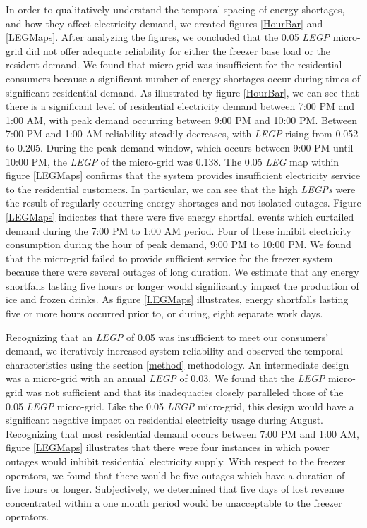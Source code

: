 \documentclass[11p]{article}
\begin{document}
 
In order to qualitatively understand the temporal spacing of energy shortages, and how they affect electricity demand, we created figures \ref{HourBar} and \ref{LEGMaps}.
After analyzing the figures, we concluded that the 0.05 \emph{LEGP} micro-grid did not offer adequate reliability for either the freezer base load or the resident demand.
We found that micro-grid was insufficient for the residential consumers because a significant number of energy shortages occur during times of significant residential demand.
As illustrated by figure \ref{HourBar}, we can see that there is a significant level of residential electricity demand between 7:00 PM and 1:00 AM, with peak demand occurring between 9:00 PM and 10:00 PM.
Between 7:00 PM and 1:00 AM reliability steadily decreases, with \emph{LEGP} rising from 0.052 to 0.205. 
During the peak demand window, which occurs between 9:00 PM until 10:00 PM, the \emph{LEGP} of the micro-grid was 0.138.
The 0.05 \emph{LEG} map within figure \ref{LEGMaps} confirms that the system provides insufficient electricity service to the residential customers. 
In particular, we can see that the high \emph{LEGPs} were the result of regularly occurring energy shortages and not isolated outages.
Figure \ref{LEGMaps} indicates that there were five energy shortfall events which curtailed demand during the 7:00 PM to 1:00 AM period.
Four of these inhibit electricity consumption during the hour of peak demand, 9:00 PM to 10:00 PM.
We found that the micro-grid failed to provide sufficient service for the freezer system because there were several outages of long duration.
We estimate that any energy shortfalls lasting five hours or longer would significantly impact the production of ice and frozen drinks. 
As figure \ref{LEGMaps} illustrates, energy shortfalls lasting five or more hours occurred prior to, or during, eight separate work days.
 

Recognizing that an \emph{LEGP} of 0.05 was insufficient to meet our consumers' demand, we iteratively increased system reliability and observed the temporal characteristics using the section \ref{method} methodology.
An intermediate design was a micro-grid with an annual \emph{LEGP} of 0.03. 
We found that the \emph{LEGP} micro-grid was not sufficient and that its inadequacies closely paralleled those of the 0.05 \emph{LEGP} micro-grid.
Like the 0.05 \emph{LEGP} micro-grid, this design would have a significant negative impact on residential electricity usage during August.
Recognizing that most residential demand occurs between 7:00 PM and 1:00 AM, figure \ref{LEGMaps} illustrates that there were four instances in which power outages would inhibit residential electricity supply. 
With respect to the freezer operators, we found that there would be five outages which have a duration of five hours or longer. 
Subjectively, we determined that five days of lost revenue concentrated within a one month period would be unacceptable to the freezer operators. 
\end{document}

